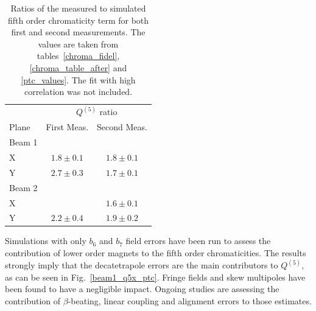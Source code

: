 \begin{table}[!htb]
    \centering
    \begin{tabular}{lcc}
      \toprule
                  &  \multicolumn{2}{c}{$Q^{(5)}$ ratio} \\
        Plane     &    First Meas.   &   Second Meas.\\
      \midrule
        Beam 1   &            & \\
        \hspace{2mm}X   & $1.8 \pm 0.1$ & $1.8 \pm 0.1$  \\
        \hspace{2mm}Y   & $2.7 \pm 0.3$ & $1.7 \pm 0.1$  \\
        Beam 2    &     & \\ 
        \hspace{2mm}X   &               & $1.6 \pm 0.1$  \\
        \hspace{2mm}Y   & $2.2 \pm 0.4$ & $1.9 \pm 0.2$  \\
      \bottomrule
    \end{tabular}
    \caption{Ratios of the measured to simulated fifth order chromaticity term for both first and second measurements.  The values are taken from tables~\ref{chroma_fidel}, \ref{chroma_table_after} and \ref{ptc_values}. The fit with high correlation was not included.}
    \label{ptc_values_ratios}
  \end{table}


Simulations with only $b_6$ and $b_7$ field errors have been run to assess the contribution of lower order magnets to the fifth order chromaticities. The results strongly imply that the decatetrapole errors are the main contributors to $Q^{(5)}$, as can be seen in Fig.~\ref{beam1_q5x_ptc}.
Fringe fields and skew multipoles have been found to have a negligible impact.
Ongoing studies are assessing the contribution of $\beta$-beating, linear coupling and alignment errors to those estimates.

